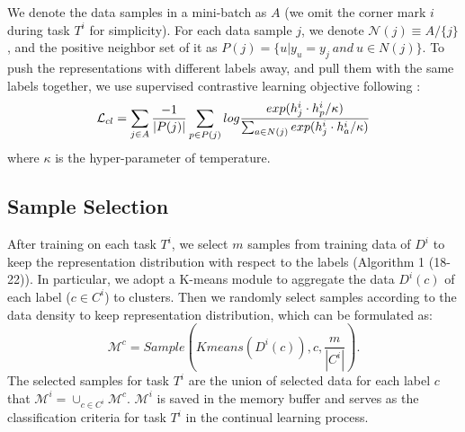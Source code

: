 We denote the data samples in a mini-batch as $A$ (we omit the corner mark $i$ during task $T^i$ for simplicity). For each data sample $j$, we denote $\mathcal{N}(j)\equiv A/\{j\}$, and the positive neighbor set of it as $P(j) = \{u| y_u = y_j  \ and \ u\in N(j)\}$. To push the representations with different labels away, and pull them with the same labels together, we use  supervised contrastive learning objective following \citet{khosla2020supervised}:
\begin{equation}\small
    \mathcal{L}_{cl} = \sum_{j\in A} \frac{-1}{|P(j)|}\sum_{p \in P(j)} log \frac{exp({h}^i_j\cdot{h}^i_p/\kappa)}{\sum_{a\in N(j)}exp({h}^i_j\cdot{h}^i_a/\kappa)}
\end{equation}
where $\kappa$ is the hyper-parameter of temperature.

\subsection{Sample Selection}
After training on each task $T^i$, we select $m$ samples from training data of $D^i$ to keep the representation distribution with respect to the labels (Algorithm 1 (18-22)). In particular, we adopt a K-means module to aggregate the data $D^i(c)$ of each label ($c \in C^i$) to clusters. Then we randomly select samples according to the data density to keep representation distribution, which can be formulated as:
\begin{equation}
    \mathcal{M}^c = Sample(Kmeans(D^i(c)),c,\frac{m}{|C^i|}).
\end{equation}
The selected samples for task $T^i$ are the union of selected data for each label $c$ that $\mathcal{M}^i = \cup_{c \in C^i} \mathcal{M}^c$.  $\mathcal{M}^i$ is saved in the  memory buffer and serves as the classification criteria for task $T^i$  in the continual learning process.


